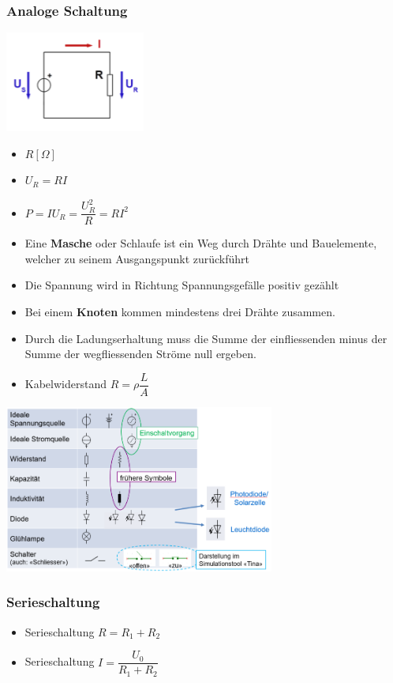 \documentclass[8pt,a4paper]{scrartcl}
\begin{document}
\begin{multicols*}{3}
			\subsubsection{Analoge Schaltung}
				\begin{multicols*}{2}		
					\includegraphics[height=3.3cm]{img/schaltung.png}
					\begin{itemize}\itemsep0pt				
						\item $R[\Omega]$
						\item $U_{R}=RI$
						\item $P=IU_{R}=\dfrac{U_{R}^{2}}{R}=RI^{2}$
					\end{itemize}
				\end{multicols*}
				\begin{itemize}\itemsep0pt
					\item Eine \textbf{Masche} oder Schlaufe ist ein Weg durch Drähte und Bauelemente, welcher zu seinem Ausgangspunkt zurückführt
					\item Die Spannung wird in Richtung Spannungsgefälle positiv gezählt
					\item Bei einem \textbf{Knoten} kommen mindestens drei Drähte zusammen.
					\item Durch die Ladungserhaltung muss die Summe der einfliessenden minus der Summe der wegfliessenden Ströme null ergeben.
					\item Kabelwiderstand $R = \rho\dfrac{L}{A}$							\end{itemize}			
				\includegraphics[height=5.5cm]{img/schaltung2.png}	
				\subsubsection{Serieschaltung}	
					\begin{itemize}\itemsep0pt
						\item Serieschaltung $R = R_{1} + R_{2}$
						\item Serieschaltung $I = \dfrac{U_{0}}{R_{1} + R_{2}}$
					\end{itemize}

\end{multicols*}
\end{document}
